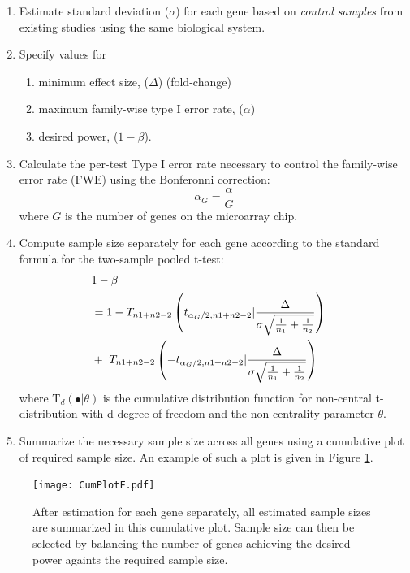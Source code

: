 \documentclass{bioinfo}
\begin{document}
\begin{enumerate}
\item{Estimate standard deviation ($\sigma$) for each gene based on
    \emph{control samples} from existing studies using the same
    biological system.}

\item{Specify values for
    \begin{enumerate}
    \item minimum effect size, ($\Delta$) (fold-change)
    \item maximum family-wise type I error rate, ($\alpha$) 
    \item desired power, ($1 - \beta$).
    \end{enumerate}
  }
  
\item{Calculate the per-test Type I error rate necessary to control
    the family-wise error rate (FWE) using the Bonferonni correction:}
\begin{equation}
  \alpha_G = \frac{\alpha}{G}
\end{equation}
%
where $G$ is the number of genes on the microarray chip.

\item{Compute sample size separately for each gene according to the
    standard formula for the two-sample pooled t-test:}
  \begin{eqnarray}
    \lefteqn{1-\beta}  \nonumber \\
    &= 1-T_{n1+n2-2} \left( t_{\alpha_G/2,n1+n2-2} | \frac{\Delta}{\sigma \sqrt{\frac{1}{n_1} + \frac{1}{n_2}}}\right) \nonumber \\
    & +~T_{n1+n2-2} \left( -t_{\alpha_G/2,n1+n2-2} | \frac{\Delta}{\sigma \sqrt{\frac{1}{n_1} + \frac{1}{n_2}}}\right)
    \label{eq:formula}
  \end{eqnarray}
  where $\mathrm{T}_{d}(\bullet|\theta)$ is the cumulative
  distribution function for non-central t-distribution with d degree
  of freedom and the non-centrality parameter $\theta$. 
  
\item{Summarize the necessary sample size across all genes using a
    cumulative plot of required sample size. An example of such a plot
    is given in Figure \ref{fig:CumPlot}.}

\end{enumerate}

\begin{figure}[h]
  \centerline{\texttt{[image: CumPlotF.pdf]}}
  \caption[Cumulative Plot of Sample Size Calculated for All Genes]
  {After estimation for each gene separately, all estimated sample
    sizes are summarized in this cumulative plot. Sample size can then
    be selected by balancing the number of genes achieving the desired
    power againts the required sample size.}
  \label{fig:CumPlot}
\end{figure}
\end{document}
